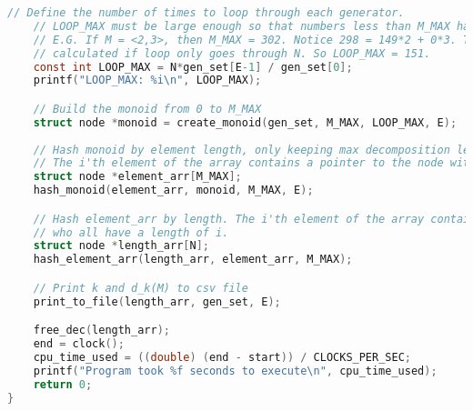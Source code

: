 \begin{lstlisting}[language=C]
    // Define the number of times to loop through each generator.
    // LOOP_MAX must be large enough so that numbers less than M_MAX have their max decomposition calculated. 
    // E.G. If M = <2,3>, then M_MAX = 302. Notice 298 = 149*2 + 0*3. Thus 298 has length of 149. But that wont be 
    // calculated if loop only goes through N. So LOOP_MAX = 151. 
    const int LOOP_MAX = N*gen_set[E-1] / gen_set[0];
    printf("LOOP_MAX: %i\n", LOOP_MAX);

    // Build the monoid from 0 to M_MAX
    struct node *monoid = create_monoid(gen_set, M_MAX, LOOP_MAX, E);
    
    // Hash monoid by element length, only keeping max decomposition length.
    // The i'th element of the array contains a pointer to the node with the maximum decomposition of element i. 
    struct node *element_arr[M_MAX];
    hash_monoid(element_arr, monoid, M_MAX, E);

    // Hash element_arr by length. The i'th element of the array contains a pointer to a linked list of nodes
    // who all have a length of i. 
    struct node *length_arr[N];
    hash_element_arr(length_arr, element_arr, M_MAX);

    // Print k and d_k(M) to csv file 
    print_to_file(length_arr, gen_set, E);

    free_dec(length_arr);
    end = clock();
    cpu_time_used = ((double) (end - start)) / CLOCKS_PER_SEC;
    printf("Program took %f seconds to execute\n", cpu_time_used);
    return 0;
}


\end{lstlisting}
